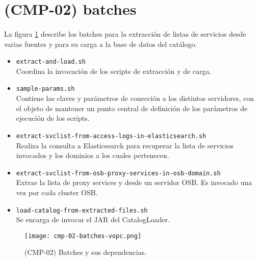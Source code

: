 \section{(CMP-02) batches}\label{sec:cmp-02}

\paragraph{}
La figura \ref{fig:cmp02-batches} describe los batches para la extracci\'on 
de listas de servicios desde varias fuentes y para su carga a la base de datos
del cat\'alogo.

\begin{itemize}
    \item {\tt extract-and-load.sh}\\
        Coordina la invocaci\'on de los scripts de extracci\'on y de carga.

    \item {\tt sample-params.sh}\\
        Contiene las claves y par\'ametros de conecci\'on a los distintos
        servidores, con el objeto de mantener un punto central de definici\'on
        de los par\'ametros de ejecuci\'on de los scripts.

    \item {\tt extract-svclist-from-access-logs-in-elasticsearch.sh}\\
        Realiza la consulta a Elasticsearch para recuperar la lista de servicios
        invocados y los dominios a los cuales pertenecen.
 
    \item {\tt extract-svclist-from-osb-proxy-services-in-osb-domain.sh}\\
        Extrae la lista de proxy services y desde un servidor OSB.
        Es invocado una vez por cada cluster OSB.
 
    \item {\tt load-catalog-from-extracted-files.sh}\\
        Se encarga de invocar el JAR del CatalogLoader.
\end{itemize}

\begin{figure}[hbt]
  \centering
  \texttt{[image: cmp-02-batches-vopc.png]}
  \caption{(CMP-02) Batches y sus dependencias.}
  \label{fig:cmp02-batches}
\end{figure}
